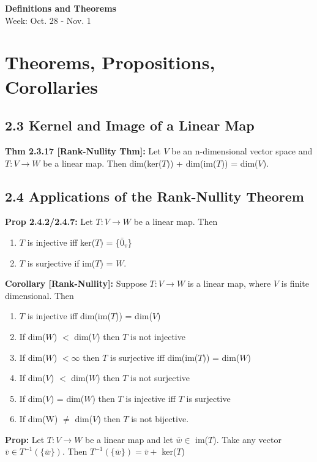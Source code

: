 \noindent
\textbf{\LARGE Definitions and Theorems} \\
\large Week: Oct. 28 - Nov. 1

\normalsize


\section*{Theorems, Propositions, Corollaries}
\subsection*{2.3 Kernel and Image of a Linear Map}

\textbf{Thm 2.3.17 [Rank-Nullity Thm]:} Let $V$ be an n-dimensional vector space and $T: V \rightarrow W$ be a linear map. Then dim(ker($T$)) + dim(im($T$)) = dim($V$).

\subsection*{2.4 Applications of the Rank-Nullity Theorem}

\textbf{Prop 2.4.2/2.4.7:} Let $T: V \rightarrow W$ be a linear map. Then
\begin{enumerate}
    \item $T$ is injective iff ker($T$) = \{$\bar 0_v$\}
    \item $T$ is surjective if im($T$) = $W$.
\end{enumerate}


\noindent
\textbf{Corollary [Rank-Nullity]:} Suppose $T: V \rightarrow W$ is a linear map, where $V$ is finite dimensional. Then
\begin{enumerate}
    \item $T$ is injective iff dim(im($T$)) = dim($V$) 
    \item If dim($W$) $<$ dim($V$) then $T$ is not injective
    \item If dim($W$) $< \infty$ then $T$ is surjective iff dim(im($T$)) = dim($W$)
    \item If dim($V$) $<$ dim($W$) then $T$ is not surjective
    \item If dim($V$) = dim($W$) then $T$ is injective iff $T$ is surjective
    \item If dim(W) $\ne$ dim($V$) then $T$ is not bijective.   
\end{enumerate}

\noindent 
\textbf{Prop:} Let $T: V \rightarrow W$ be a linear map and let $\bar w \in $ im($T$). Take any vector $\bar v \in T^{-1}(\{\bar w\})$. Then $T^{-1}(\{\bar w\}) = \bar v + $ ker($T$)

